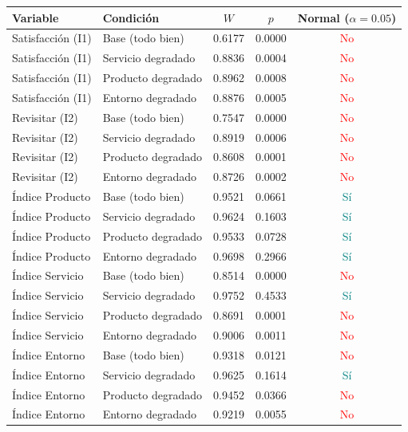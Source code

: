\documentclass[
  spanish,
]{article}
\begin{document}
\begin{table}[!h]
\centering\begingroup\fontsize{9}{11}\selectfont

\begin{tabular}{llcc>{}c}
\toprule
Variable & Condición & $W$ & $p$ & Normal ($\alpha=0.05$)\\
\midrule
Satisfacción (I1) & Base (todo bien) & 0.6177 & 0.0000 & \textcolor{red}{No}\\
Satisfacción (I1) & Servicio degradado & 0.8836 & 0.0004 & \textcolor{red}{No}\\
Satisfacción (I1) & Producto degradado & 0.8962 & 0.0008 & \textcolor{red}{No}\\
Satisfacción (I1) & Entorno degradado & 0.8876 & 0.0005 & \textcolor{red}{No}\\
Revisitar (I2) & Base (todo bien) & 0.7547 & 0.0000 & \textcolor{red}{No}\\
\addlinespace
Revisitar (I2) & Servicio degradado & 0.8919 & 0.0006 & \textcolor{red}{No}\\
Revisitar (I2) & Producto degradado & 0.8608 & 0.0001 & \textcolor{red}{No}\\
Revisitar (I2) & Entorno degradado & 0.8726 & 0.0002 & \textcolor{red}{No}\\
Índice Producto & Base (todo bien) & 0.9521 & 0.0661 & \textcolor{teal}{Sí}\\
Índice Producto & Servicio degradado & 0.9624 & 0.1603 & \textcolor{teal}{Sí}\\
\addlinespace
Índice Producto & Producto degradado & 0.9533 & 0.0728 & \textcolor{teal}{Sí}\\
Índice Producto & Entorno degradado & 0.9698 & 0.2966 & \textcolor{teal}{Sí}\\
Índice Servicio & Base (todo bien) & 0.8514 & 0.0000 & \textcolor{red}{No}\\
Índice Servicio & Servicio degradado & 0.9752 & 0.4533 & \textcolor{teal}{Sí}\\
Índice Servicio & Producto degradado & 0.8691 & 0.0001 & \textcolor{red}{No}\\
\addlinespace
Índice Servicio & Entorno degradado & 0.9006 & 0.0011 & \textcolor{red}{No}\\
Índice Entorno & Base (todo bien) & 0.9318 & 0.0121 & \textcolor{red}{No}\\
Índice Entorno & Servicio degradado & 0.9625 & 0.1614 & \textcolor{teal}{Sí}\\
Índice Entorno & Producto degradado & 0.9452 & 0.0366 & \textcolor{red}{No}\\
Índice Entorno & Entorno degradado & 0.9219 & 0.0055 & \textcolor{red}{No}\\
\bottomrule
\end{tabular}
\endgroup{}
\end{table}
\end{document}
